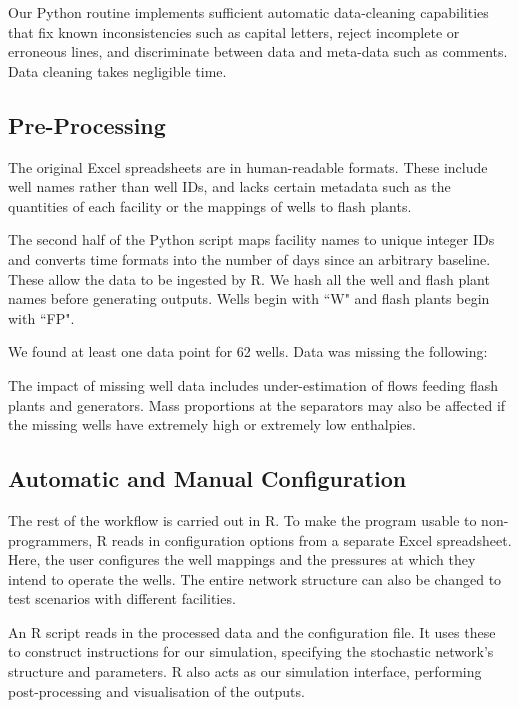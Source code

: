 \documentclass[a4paper, 12pt]{article}
\begin{document}
Our Python routine implements sufficient automatic data-cleaning capabilities that fix known inconsistencies such as capital letters, reject incomplete or erroneous lines, and discriminate between data and meta-data such as comments. Data cleaning takes negligible time.

\subsection{Pre-Processing}
The original Excel spreadsheets are in human-readable formats. These include well names rather than well IDs, and lacks certain metadata such as the quantities of each facility or the mappings of wells to flash plants.

The second half of the Python script maps facility names to unique integer IDs and converts time formats into the number of days since an arbitrary baseline. These allow the data to be ingested by R. We hash all the well and flash plant names before generating outputs. Wells begin with ``W" and flash plants begin with ``FP".

We found at least one data point for 62 wells. Data was missing the following:


The impact of missing well data includes under-estimation of flows feeding flash plants and generators. Mass proportions at the separators may also be affected if the missing wells have extremely high or extremely low enthalpies.

\subsection{Automatic and Manual Configuration}
The rest of the workflow is carried out in R. To make the program usable to non-programmers, R reads in configuration options from a separate Excel spreadsheet. Here, the user configures the well mappings and the pressures at which they intend to operate the wells. The entire network structure can also be changed to test scenarios with different facilities.

An R script reads in the processed data and the configuration file. It uses these to construct instructions for our simulation, specifying the stochastic network's structure and parameters. R also acts as our simulation interface, performing post-processing and visualisation of the outputs.

\end{document}

